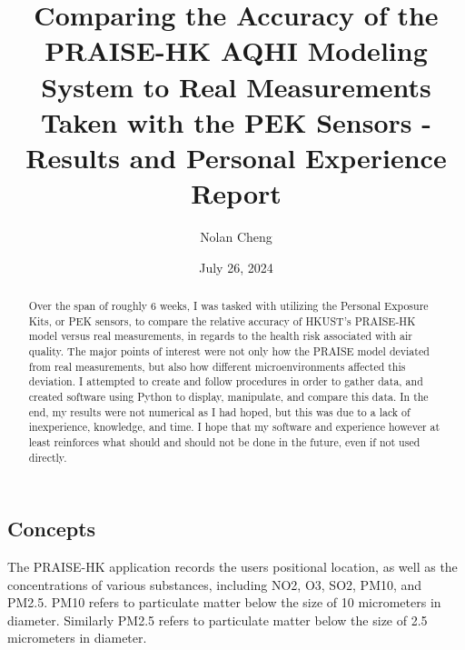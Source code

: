 \documentclass{article}
\title{Comparing the Accuracy of the PRAISE-HK AQHI Modeling System to 
Real Measurements Taken with the PEK Sensors - Results and Personal 
Experience Report}
\author{Nolan Cheng}
\date{July 26, 2024}
\begin{document}
\maketitle
\begin{multicols}{2}

\begin{abstract}
  Over the span of roughly 6 weeks, I was tasked with utilizing the 
  Personal Exposure Kits, or PEK sensors, to compare the relative accuracy 
  of HKUST's PRAISE-HK model versus real measurements, in regards to the
  health risk associated with air quality. The major points of interest
  were not only how the PRAISE model deviated from real measurements, 
  but also how different microenvironments affected this deviation.
  I attempted to create and follow procedures in order to gather 
  data, and created software using Python to display, manipulate, and 
  compare this data. In the end, my results were not numerical as I had 
  hoped, but this was due to a lack of inexperience, knowledge, and time.
  I hope that my software and experience however at least reinforces 
  what should and should not be done in the future, even if not used
  directly.
\end{abstract}


\section{Concepts}
\label{section:Concepts}

The PRAISE-HK application records the users positional location, as well as 
the concentrations of various substances, including NO2, O3, SO2, PM10, and PM2.5.
PM10 refers to particulate matter below the size of 10 micrometers in diameter. 
Similarly PM2.5 refers to particulate matter below the size of 2.5 micrometers in 
diameter.


\end{multicols}
\end{document}

